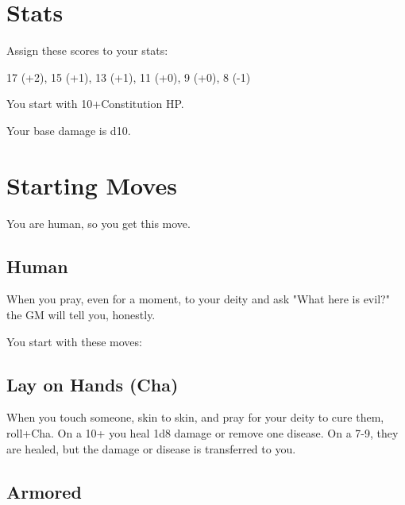  
\section{Stats}   
 



Assign these scores to your stats:

 

17 (+2), 15 (+1), 13 (+1), 11 (+0), 9 (+0), 8 (-1)

 

You start with 10+Constitution HP.



 

Your base damage is d10.

 
\section{Starting Moves}   
 




\startInstructionsAfterHeader
You are human, so you get this move.
\stopInstructionsAfterHeader
 
\subsection{Human}   
 

When you pray, even for a moment, to your deity and ask "What here is evil?" the GM will tell you, honestly.



 


\startInstructions
You start with these moves:
\stopInstructions
 
\subsection{Lay on Hands (Cha)}     
 

When you touch someone, skin to skin, and pray for your deity to cure them, roll+Cha. On a 10+ you heal 1d8 damage or remove one disease. On a 7-9, they are healed, but the damage or disease is transferred to you.

 
\subsection{Armored}   
 

